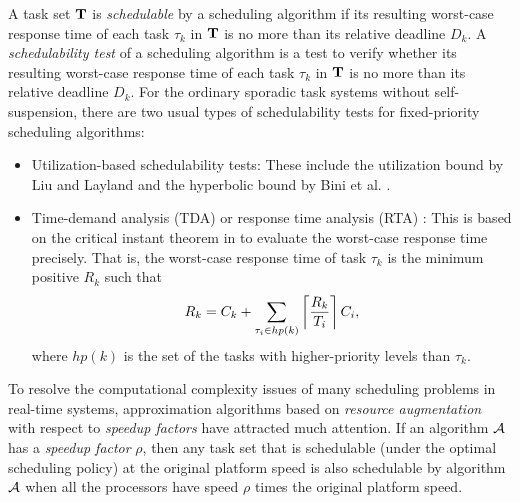 A task set ${\bf T}$ is \emph{schedulable} by a scheduling algorithm if its resulting worst-case response time of each task 
$\tau_k$ in ${\bf T}$ is no more than its relative deadline $D_k$.
A \emph{schedulability test} of a scheduling algorithm is a test to
verify whether its resulting worst-case response time of each task
$\tau_k$ in ${\bf T}$ is no more than its relative deadline $D_k$. For
the ordinary sporadic task systems without self-suspension, there are
two usual types of schedulability tests for fixed-priority scheduling
algorithms:
\begin{itemize}
\item Utilization-based schedulability tests: These include the
  utilization bound by Liu and Layland \cite{Liu_1973}  and the
  hyperbolic bound by Bini et al. \cite{bini2003rate}.
\item Time-demand analysis (TDA) or response time analysis (RTA) \cite{lehoczky-1989}: This is based on the critical instant
  theorem in
  \cite{Liu_1973} to evaluate the worst-case response time
  precisely. That is, the worst-case response time of task $\tau_k$ is
  the minimum positive $R_k$ such that
  \begin{equation}
   \label{eq:rta}
  R_k = C_k+ \sum_{\tau_i \in hp(k)}\left\lceil{\frac{R_k}{T_i}}\right\rceil C_i,     
  \end{equation}
  where $hp(k)$ is the set of the tasks with higher-priority levels
  than $\tau_k$.  
\end{itemize}


To resolve the computational complexity issues of many scheduling problems in real-time systems, approximation algorithms based on \textit{resource augmentation} with respect to \emph{speedup factors} have attracted much attention.  If an algorithm ${\cal A}$ has a \emph{speedup factor} $\rho$, then any task set that is schedulable (under the optimal scheduling policy) at the original platform speed is also schedulable by algorithm ${\cal A}$ when all the processors have speed $\rho$ times the original platform speed.




